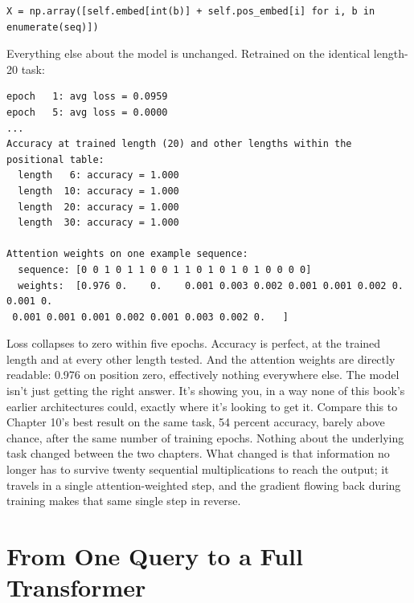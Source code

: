 \begin{Verbatim}[fontsize=\small, frame=single, xleftmargin=1em, xrightmargin=1em]
X = np.array([self.embed[int(b)] + self.pos_embed[i] for i, b in enumerate(seq)])
\end{Verbatim}

Everything else about the model is unchanged. Retrained on the identical length-20 task:

\begin{Verbatim}[fontsize=\small, frame=single, xleftmargin=1em, xrightmargin=1em]
epoch   1: avg loss = 0.0959
epoch   5: avg loss = 0.0000
...
Accuracy at trained length (20) and other lengths within the positional table:
  length   6: accuracy = 1.000
  length  10: accuracy = 1.000
  length  20: accuracy = 1.000
  length  30: accuracy = 1.000

Attention weights on one example sequence:
  sequence: [0 0 1 0 1 1 0 0 1 1 0 1 0 1 0 1 0 0 0 0]
  weights:  [0.976 0.    0.    0.001 0.003 0.002 0.001 0.001 0.002 0.    0.001 0.
 0.001 0.001 0.001 0.002 0.001 0.003 0.002 0.   ]
\end{Verbatim}

Loss collapses to zero within five epochs. Accuracy is perfect, at the trained length and at every other length tested. And the attention weights are directly readable: 0.976 on position zero, effectively nothing everywhere else. The model isn't just getting the right answer. It's showing you, in a way none of this book's earlier architectures could, exactly where it's looking to get it. Compare this to Chapter 10's best result on the same task, 54 percent accuracy, barely above chance, after the same number of training epochs. Nothing about the underlying task changed between the two chapters. What changed is that information no longer has to survive twenty sequential multiplications to reach the output; it travels in a single attention-weighted step, and the gradient flowing back during training makes that same single step in reverse.

\section*{From One Query to a Full Transformer}

